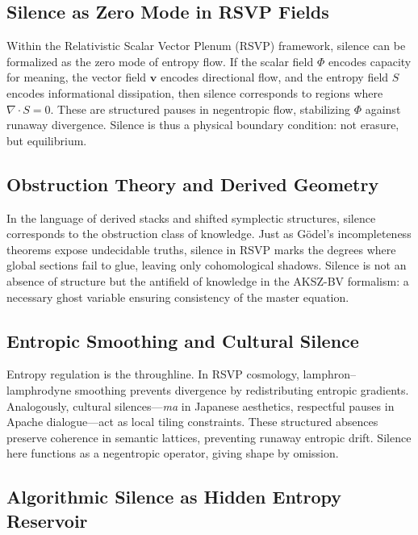 \documentclass[12pt,a4paper]{article}
\begin{document}
\subsection{Silence as Zero Mode in RSVP Fields}

Within the Relativistic Scalar Vector Plenum (RSVP) framework, silence can be formalized as the zero mode of entropy flow. If the scalar field $\Phi$ encodes capacity for meaning, the vector field $\mathbf{v}$ encodes directional flow, and the entropy field $S$ encodes informational dissipation, then silence corresponds to regions where $\nabla \cdot S = 0$. These are structured pauses in negentropic flow, stabilizing $\Phi$ against runaway divergence. Silence is thus a physical boundary condition: not erasure, but equilibrium.

\subsection{Obstruction Theory and Derived Geometry}

In the language of derived stacks and shifted symplectic structures, silence corresponds to the obstruction class of knowledge. Just as Gödel’s incompleteness theorems expose undecidable truths, silence in RSVP marks the degrees where global sections fail to glue, leaving only cohomological shadows. Silence is not an absence of structure but the antifield of knowledge in the AKSZ-BV formalism: a necessary ghost variable ensuring consistency of the master equation.

\subsection{Entropic Smoothing and Cultural Silence}

Entropy regulation is the throughline. In RSVP cosmology, lamphron–lamphrodyne smoothing prevents divergence by redistributing entropic gradients. Analogously, cultural silences—\emph{ma} in Japanese aesthetics, respectful pauses in Apache dialogue—act as local tiling constraints. These structured absences preserve coherence in semantic lattices, preventing runaway entropic drift. Silence here functions as a negentropic operator, giving shape by omission.

\subsection{Algorithmic Silence as Hidden Entropy Reservoir}
\end{document}
